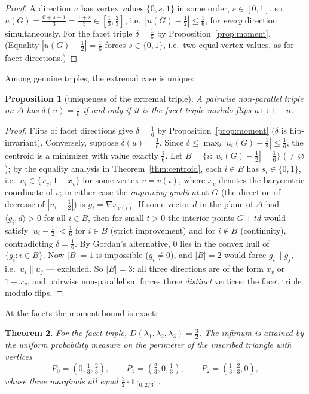 \documentclass[11pt,reqno]{amsart}
\theoremstyle{plain}
\newtheorem{theorem}{Theorem}[section]
\newtheorem{proposition}[theorem]{Proposition}
\theoremstyle{definition}
\theoremstyle{remark}
\begin{document}
\begin{proof}
A direction $u$ has vertex values $\{0,s,1\}$ in some order, $s\in[0,1]$, so
$u(G)=\tfrac{0+s+1}3=\tfrac{1+s}3\in[\tfrac13,\tfrac23]$, i.e.\
$|u(G)-\tfrac12|\le\tfrac16$, for \emph{every} direction simultaneously. For
the facet triple $\delta=\tfrac16$ by Proposition~\ref{prop:moment}. (Equality
$|u(G)-\tfrac12|=\tfrac16$ forces $s\in\{0,1\}$, i.e.\ two equal vertex
values, as for facet directions.)
\end{proof}

Among genuine triples, the extremal case is unique:

\begin{proposition}[uniqueness of the extremal triple]\label{prop:deltamax}
A pairwise non-parallel triple on $\Delta$ has $\delta(u)=\tfrac16$ if and
only if it is the facet triple modulo flips $u\mapsto1-u$.
\end{proposition}

\begin{proof}
Flips of facet directions give $\delta=\tfrac16$ by
Proposition~\ref{prop:moment} ($\delta$ is flip-invariant). Conversely,
suppose $\delta(u)=\tfrac16$. Since
$\delta\le\max_i|u_i(G)-\tfrac12|\le\tfrac16$, the centroid is a minimizer
with value exactly $\tfrac16$. Let $B=\{i:|u_i(G)-\tfrac12|=\tfrac16\}$
($\ne\varnothing$); by the equality analysis in
Theorem~\ref{thm:centroid}, each $i\in B$ has $s_i\in\{0,1\}$, i.e.\
$u_i\in\{x_{v},1-x_{v}\}$ for some vertex $v=v(i)$, where $x_v$ denotes the
barycentric coordinate of $v$; in either case the \emph{improving gradient}
at $G$ (the direction of decrease of $|u_i-\tfrac12|$) is
$g_i=\nabla x_{v(i)}$. If some vector $d$ in the plane of $\Delta$ had
$\langle g_i,d\rangle>0$ for all $i\in B$, then for small $t>0$ the interior
points $G+td$ would satisfy $|u_i-\tfrac12|<\tfrac16$ for $i\in B$ (strict
improvement) and for $i\notin B$ (continuity), contradicting
$\delta=\tfrac16$. By Gordan's alternative, $0$ lies in the convex hull of
$\{g_i:i\in B\}$. Now $|B|=1$ is impossible ($g_i\ne0$), and $|B|=2$ would
force $g_i\parallel g_j$, i.e.\ $u_i\parallel u_j$ --- excluded. So $|B|=3$:
all three directions are of the form $x_v$ or $1-x_v$, and pairwise
non-parallelism forces three \emph{distinct} vertices: the facet triple
modulo flips.
\end{proof}

At the facets the moment bound is exact:

\begin{theorem}\label{thm:facetdefect}
For the facet triple, $D(\lambda_1,\lambda_2,\lambda_3)=\tfrac32$. The infimum
is attained by the uniform probability measure on the perimeter of the inscribed
triangle with vertices
\[
P_0=(0,\tfrac13,\tfrac23),\qquad P_1=(\tfrac23,0,\tfrac13),\qquad
P_2=(\tfrac13,\tfrac23,0),
\]
whose three marginals all equal $\tfrac32\cdot\mathbf 1_{[0,2/3]}$.
\end{theorem}
\end{document}
